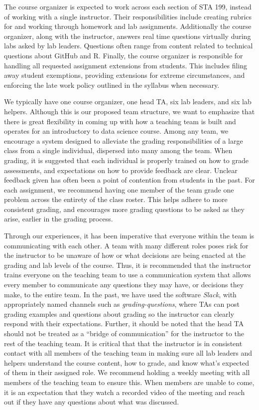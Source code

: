 \documentclass[
  12pt]{article}
\begin{document}
The course organizer is expected to work across each section of STA 199,
instead of working with a single instructor. Their responsibilities
include creating rubrics for and working through homework and lab
assignments. Additionally the course organizer, along with the
instructor, answers real time questions virtually during labs asked by
lab leaders. Questions often range from content related to technical
questions about GitHub and R. Finally, the course organizer is
responsible for handling all requested assignment extensions from
students. This includes filing away student exemptions, providing
extensions for extreme circumstances, and enforcing the late work policy
outlined in the syllabus when necessary.

We typically have one course organizer, one head TA, six lab leaders,
and six lab helpers. Although this is our proposed team structure, we
want to emphasize that there is great flexibility in coming up with how
a teaching team is built and operates for an introductory to data
science course. Among any team, we encourage a system designed to
alleviate the grading responsibilities of a large class from a single
individual, dispersed into many among the team. When grading, it is
suggested that each individual is properly trained on how to grade
assessments, and expectations on how to provide feedback are clear.
Unclear feedback given has often been a point of contention from
students in the past. For each assignment, we recommend having one
member of the team grade one problem across the entirety of the class
roster. This helps adhere to more consistent grading, and encourages
more grading questions to be asked as they arise, earlier in the grading
process.

Through our experiences, it has been imperative that everyone within the
team is communicating with each other. A team with many different roles
poses risk for the instructor to be unaware of how or what decisions are
being enacted at the grading and lab levels of the course. Thus, it is
recommended that the instructor trains everyone on the teaching team to
use a communication system that allows every member to communicate any
questions they may have, or decisions they make, to the entire team. In
the past, we have used the software \emph{Slack}, with appropriately
named channels such as \emph{grading-questions}, where TAs can post
grading examples and questions about grading so the instructor can
clearly respond with their expectations. Further, it should be noted
that the head TA should not be treated as a ``bridge of communication''
for the instructor to the rest of the teaching team. It is critical that
that the instructor is in consistent contact with all members of the
teaching team in making sure all lab leaders and helpers understand the
course content, how to grade, and know what's expected of them in their
assigned role. We recommend holding a weekly meeting with all members of
the teaching team to ensure this. When members are unable to come, it is
an expectation that they watch a recorded video of the meeting and reach
out if they have any questions about what was discussed.
\end{document}
